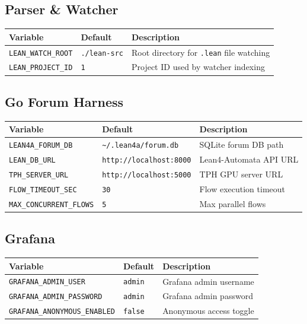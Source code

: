 \subsection{Parser \& Watcher}

\begin{longtable}{@{}llp{5.5cm}@{}}
\toprule
\textbf{Variable} & \textbf{Default} & \textbf{Description} \\
\midrule
\endfirsthead
\bottomrule
\endfoot
\texttt{LEAN\_WATCH\_ROOT} & \texttt{./lean-src} & Root directory for \texttt{.lean} file watching \\
\texttt{LEAN\_PROJECT\_ID} & \texttt{1}          & Project ID used by watcher indexing \\
\end{longtable}

\subsection{Go Forum Harness}

\begin{longtable}{@{}llp{5.5cm}@{}}
\toprule
\textbf{Variable} & \textbf{Default} & \textbf{Description} \\
\midrule
\endfirsthead
\bottomrule
\endfoot
\texttt{LEAN4A\_FORUM\_DB}      & \texttt{\textasciitilde/.lean4a/forum.db} & SQLite forum DB path \\
\texttt{LEAN\_DB\_URL}          & \texttt{http://localhost:8000}            & Lean4-Automata API URL \\
\texttt{TPH\_SERVER\_URL}       & \texttt{http://localhost:5000}            & TPH GPU server URL \\
\texttt{FLOW\_TIMEOUT\_SEC}     & \texttt{30}                              & Flow execution timeout \\
\texttt{MAX\_CONCURRENT\_FLOWS} & \texttt{5}                               & Max parallel flows \\
\end{longtable}

\subsection{Grafana}

\begin{longtable}{@{}llp{5.5cm}@{}}
\toprule
\textbf{Variable} & \textbf{Default} & \textbf{Description} \\
\midrule
\endfirsthead
\bottomrule
\endfoot
\texttt{GRAFANA\_ADMIN\_USER}       & \texttt{admin} & Grafana admin username \\
\texttt{GRAFANA\_ADMIN\_PASSWORD}   & \texttt{admin} & Grafana admin password \\
\texttt{GRAFANA\_ANONYMOUS\_ENABLED}& \texttt{false} & Anonymous access toggle \\
\end{longtable}
